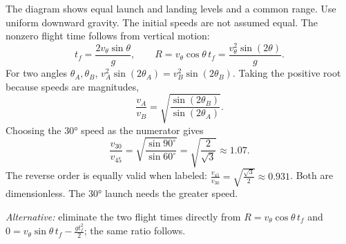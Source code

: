 \quizpairbreak
\begin{problem}[25 pts]
\end{problem}
\begin{solution}
The diagram shows equal launch and landing levels and a common range.
Use uniform downward gravity. The initial speeds are not assumed equal.
The nonzero flight time follows from vertical motion:
\[
t_f=\frac{2v_\theta\sin\theta}{g},\qquad
R=v_\theta\cos\theta\,t_f
=\frac{v_\theta^2\sin(2\theta)}{g}.
\]
For two angles $\theta_A,\theta_B$,
$v_A^2\sin(2\theta_A)=v_B^2\sin(2\theta_B)$.
Taking the positive root because speeds are magnitudes,
\[
\frac{v_A}{v_B}
=\sqrt{\frac{\sin(2\theta_B)}{\sin(2\theta_A)}}.
\]
Choosing the \ang{30} speed as the numerator gives
\[
\frac{v_{30}}{v_{45}}
=\sqrt{\frac{\sin90^\circ}{\sin60^\circ}}
=\sqrt{\frac{2}{\sqrt3}}\approx1.07.
\]
The reverse order is equally valid when labeled:
$\frac{v_{45}}{v_{30}}=\sqrt{\frac{\sqrt3}{2}}\approx0.931$.
Both are dimensionless. The \ang{30} launch needs the greater speed.

\textit{Alternative:} eliminate the two flight times directly from
$R=v_\theta\cos\theta\,t_f$ and
$0=v_\theta\sin\theta\,t_f-\frac{gt_f^2}{2}$; the same ratio follows.
\end{solution}


